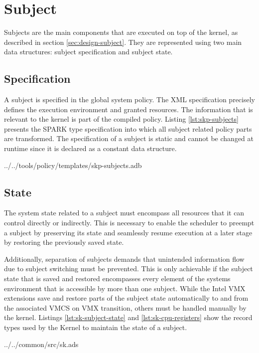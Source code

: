 \section{Subject}\label{sec:impl-subject}
Subjects are the main components that are executed on top of the kernel, as
described in section \ref{sec:design-subject}. They are represented using two
main data structures: subject specification and subject state.

\subsection{Specification}
A subject is specified in the global system policy. The XML specification
precisely defines the execution environment and granted resources. The
information that is relevant to the kernel is part of the compiled policy.
Listing \ref{lst:skp-subjects} presents the SPARK type specification into which
all subject related policy parts are transformed. The specification of a subject
is static and cannot be changed at runtime since it is declared as a constant
data structure.


	{../../tools/policy/templates/skp-subjects.adb}

\subsection{State}
The system state related to a subject must encompass all resources that it can
control directly or indirectly. This is necessary to enable the scheduler to
preempt a subject by preserving its state and seamlessly resume execution at a
later stage by restoring the previously saved state.

Additionally, separation of subjects demands that unintended information flow
due to subject switching must be prevented. This is only achievable if the
subject state that is saved and restored encompasses every element of the
systems environment that is accessible by more than one subject. While the Intel
VMX extensions save and restore parts of the subject state automatically to and
from the associated VMCS on VMX transition, others must be handled manually by
the kernel. Listings \ref{lst:sk-subject-state} and \ref{lst:sk-cpu-registers}
show the record types used by the Kernel to maintain the state of a subject.


	{../../common/src/sk.ads}

